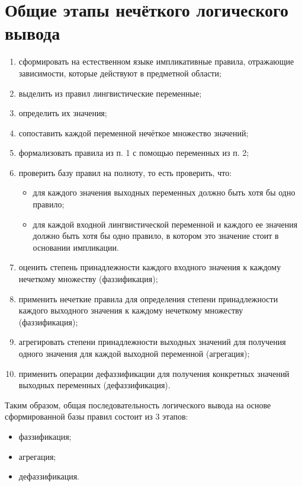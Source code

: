 \documentclass[12pt]{report}
\begin{document}
\section{Общие этапы нечёткого логического вывода}
\begin{enumerate}
    \item сформировать на естественном языке импликативные правила, отражающие зависимости, которые действуют в предметной области;
    \item выделить из правил лингвистические переменные;
    \item определить их значения;
    \item сопоставить каждой переменной нечёткое множество значений;
    \item формализовать правила из п. 1 с помощью переменных из п. 2;
    \item проверить базу правил на полноту, то есть проверить, что:
    \begin{itemize}
        \item для каждого значения выходных переменных должно быть хотя бы одно правило;
        \item для каждой входной лингвистической переменной и каждого ее значения должно быть хотя бы одно правило, в котором это значение стоит в основании импликации.
    \end{itemize}
    \item оценить степень принадлежности каждого входного значения к каждому нечеткому множеству (фаззификация);
    \item применить нечеткие правила для определения степени принадлежности каждого выходного значения к каждому нечеткому множеству (фаззификация);
    \item агрегировать степени принадлежности выходных значений для получения одного значения для каждой выходной переменной (агрегация);
    \item применить операции дефаззификации для получения конкретных значений выходных переменных (дефаззификация).
\end{enumerate}

Таким образом, общая последовательность логического вывода на основе сформированной базы правил состоит из 3 этапов:
\begin{itemize}
    \item фаззификация;
    \item агрегация;
    \item дефаззификация.
\end{itemize}
\end{document}

